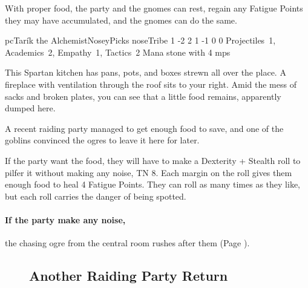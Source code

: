 \begin{multicols}{2}
With proper food, the party and the gnomes can rest, regain any Fatigue Points they may have accumulated, and the gnomes can do the same.




\N\gls{pc}{\Gn\F}{Tar\'ik the Alchemist}{Nosey}{Picks nose}{Tribe}
{1}%
{-2}%
{{2}%
{1}%
{-1}}%
{0}%
{0}%
{Projectiles~1, Academics~2, Empathy~1, Tactics~2
\knacks{\alchemist}
}%
{Mana stone with 4 \glspl{mp}}%
{\addtocounter{sp}{8}}


\begin{boxtext}

  This Spartan kitchen has pans, pots, and boxes strewn all over the place.
  A fireplace with ventilation through the roof sits to your right.
  Amid the mess of sacks and broken plates, you can see that a little food remains, apparently dumped here.

\end{boxtext}

A recent raiding party managed to get enough food to save, and one of the goblins convinced the ogres to leave it here for later.

If the party want the food, they will have to make a Dexterity + Stealth roll to pilfer it without making any noise, TN 8.
Each margin on the roll gives them enough food to heal 4 Fatigue Points.
They can roll as many times as they like, but each roll carries the danger of being spotted.

\paragraph{If the party make any noise,}
the chasing ogre from the central room rushes after them (Page \pageref{chasingogre}).


\begin{figure*}[b!]

\setcounter{enc}{\value{list}}
\subsection{Another Raiding Party Return}
\setcounter{list}{\value{enc}}


\end{figure*}
\end{multicols}
